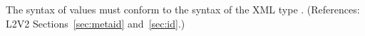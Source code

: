 The syntax of   values must conform to the syntax of the
XML type .  (References: L2V2 Sections~\ref{sec:metaid}
and~\ref{sec:id}.)
